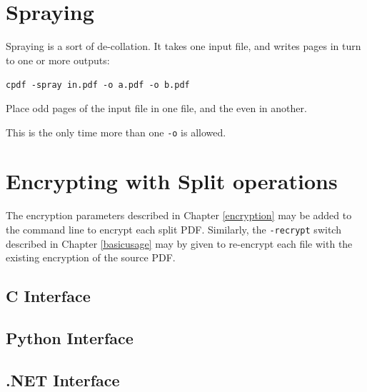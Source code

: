 \documentclass{book}
\begin{document}
\section{Spraying}

Spraying is a sort of de-collation. It takes one input file, and writes pages in turn to one or more outputs:

  \begin{framed}\small
    \noindent\verb!cpdf -spray in.pdf -o a.pdf -o b.pdf!

    \vspace{2.5mm}
    \noindent Place odd pages of the input file in one file, and the even in another.

  \end{framed}

\noindent This is the only time more than one \texttt{-o} is allowed.

\section{Encrypting with Split operations}
The encryption parameters described in Chapter \ref{encryption} may be added to the command line to encrypt each split PDF. Similarly, the \texttt{-recrypt} switch described in Chapter \ref{basicusage} may by given to re-encrypt each file with the existing encryption of the source PDF. 
\pagestyle{empty}\thispagestyle{fancy}

\begin{cpdflib}
\clearpage
\section*{C Interface}
\begin{small}\tt

\end{small}
\end{cpdflib}

\begin{pycpdflib}
\clearpage
\section*{Python Interface}
\begin{small}\tt

\end{small}
\end{pycpdflib}

\begin{dotnetcpdflib}
\clearpage
\section*{.NET Interface}
\begin{small}\tt

\end{small}
\end{dotnetcpdflib}
\end{document}
